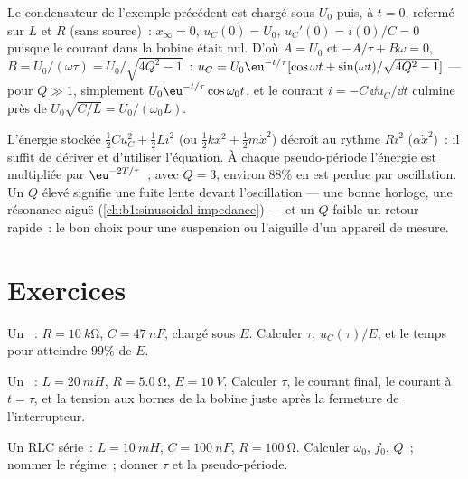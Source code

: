 \begin{example}\label{ex:b1:transient-regimes:ic}
Le condensateur de l'exemple précédent est chargé sous $U_0$ puis, à
$t = 0$, refermé sur $L$ et $R$ (sans source)~: $x_\infty = 0$,
$u_C(0) = U_0$, $u_C'(0) = i(0)/C = 0$ puisque le courant dans la bobine
était nul. D'où $A = U_0$ et $-A/\tau + B\omega = 0$, $B = U_0/(\omega\tau) =
U_0/\sqrt{4Q^2 - 1}$~: $u_C = U_0\eu^{-t/\tau}[\cos\omega t + \sin(\omega
t)/\sqrt{4Q^2 - 1}]$ --- pour $Q \gg 1$, simplement $U_0\eu^{-t/\tau}\cos\omega_0 t$,
et le courant $i = -C\,\dd u_C/\dd t$ culmine près de $U_0\sqrt{C/L} =
U_0/(\omega_0 L)$.
\end{example}

\begin{remark}[Énergie]\label{rem:b1:transient-regimes:energy}
L'énergie stockée $\tfrac12 Cu_C^2 + \tfrac12 Li^2$ (ou $\tfrac12 kx^2
+ \tfrac12 m\dot x^2$) décroît au rythme $Ri^2$ ($\alpha\dot x^2$)~: il
suffit de dériver et d'utiliser l'équation. À chaque pseudo-période
l'énergie est multipliée par $\eu^{-2T/\tau}$~; avec $Q = 3$, environ
$88\%$ en est perdue par oscillation. Un $Q$ élevé signifie une fuite
lente devant l'oscillation --- une bonne horloge, une résonance aiguë
(\cref{ch:b1:sinusoidal-impedance}) --- et un $Q$ faible un retour
rapide~: le bon choix pour une suspension ou l'aiguille d'un appareil de
mesure.
\end{remark}

\section{Exercices}

\begin{exercise}[$\star$]\label{exo:b1:transient-regimes:1}
Un ~: $R = \qty{10}{k\ohm}$, $C = \qty{47}{nF}$, chargé sous
$E$. Calculer $\tau$, $u_C(\tau)/E$, et le temps pour atteindre $99\%$ de $E$.
\end{exercise}

\begin{exercise}[$\star$]\label{exo:b1:transient-regimes:2}
Un ~: $L = \qty{20}{mH}$, $R = \qty{5.0}{\ohm}$, $E = \qty{10}{V}$.
Calculer $\tau$, le courant final, le courant à $t = \tau$, et la tension
aux bornes de la bobine juste après la fermeture de l'interrupteur.
\end{exercise}

\begin{exercise}[$\star$]\label{exo:b1:transient-regimes:3}
Un RLC série~: $L = \qty{10}{mH}$, $C = \qty{100}{nF}$, $R = \qty{100}{\ohm}$.
Calculer $\omega_0$, $f_0$, $Q$~; nommer le régime~; donner $\tau$ et la
pseudo-période.
\end{exercise}

